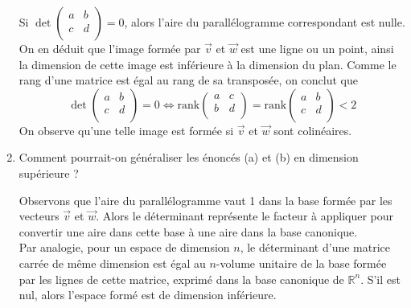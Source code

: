 \documentclass[a4paper, 10pt]{report}
\begin{document}
\begin{enumerate}[label = (\alph*)]
		\colorbox{solution}
		{\begin{minipage}{0.9\textwidth}
			Si $\det \left(\begin{smallmatrix}a & b\\
				c & d\\\end{smallmatrix}\right) = 0$, alors l'aire du
			parallélogramme correspondant est nulle. On en déduit que
			l'image formée par $\vec{v}$ et $\vec{w}$ est une ligne ou
			un point, ainsi la dimension de cette image est inférieure
			à la dimension du plan. Comme le rang d'une matrice est égal
			au rang de sa transposée, on conclut que
			\[
				\det \begin{pmatrix}a & b\\ c & d\\\end{pmatrix} = 0 \iff
				\mathrm{rank}\begin{pmatrix}a & c\\ b & d\\\end{pmatrix} =
				\mathrm{rank}\begin{pmatrix}a & b\\ c & d\\\end{pmatrix} < 2
			\]
			On observe qu'une telle image est formée si $\vec{v}$ et 
			$\vec{w}$ sont colinéaires.
		\end{minipage}}
		
		\item Comment pourrait-on généraliser les énoncés (a) et (b) en
		dimension supérieure ?
		
		\colorbox{solution}
		{\begin{minipage}{0.9\textwidth}
			Observons que l'aire du parallélogramme vaut 1 dans
			la base formée par les vecteurs $\vec{v}$ et $\vec{w}$.
			Alors le déterminant représente le facteur à appliquer pour
			convertir une aire dans cette base à une aire dans la base
			canonique.\\
			Par analogie, pour un espace de dimension $n$, le déterminant
			d'une matrice carrée de même dimension est égal au $n$-volume
			unitaire de la base formée par les lignes de cette matrice,
			exprimé dans la base canonique de $\mathbb{R}^n$. S'il est
			nul, alors l'espace formé est de dimension inférieure.
		\end{minipage}}
	\end{enumerate}
	
	\newpage
	
\end{document}
